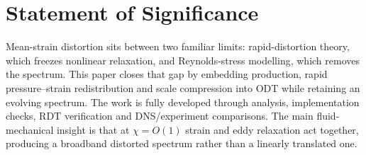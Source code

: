 \documentclass[11pt,a4paper]{article}
\begin{document}
\section*{Statement of Significance}

Mean-strain distortion sits between two familiar limits: rapid-distortion
theory, which freezes nonlinear relaxation, and Reynolds-stress modelling, which
removes the spectrum. This paper closes that gap by embedding production, rapid
pressure--strain redistribution and scale compression into ODT while retaining
an evolving spectrum. The work is fully developed through analysis,
implementation checks, RDT verification and DNS/experiment comparisons. The main
fluid-mechanical insight is that at $\chi=O(1)$ strain and eddy relaxation act
together, producing a broadband distorted spectrum rather than a linearly
translated one.
\end{document}
